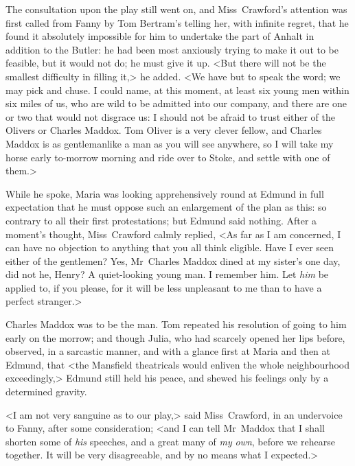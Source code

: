 The consultation upon the play still went on, and Miss~Crawford's attention was first called from Fanny by Tom Bertram's telling her, with infinite regret, that he found it absolutely impossible for him to undertake the part of Anhalt in addition to the Butler: he had been most anxiously trying to make it out to be feasible, but it would not do; he must give it up. <But there will not be the smallest difficulty in filling it,> he added. <We have but to speak the word; we may pick and chuse. I could name, at this moment, at least six young men within six miles of us, who are wild to be admitted into our company, and there are one or two that would not disgrace us: I should not be afraid to trust either of the Olivers or Charles Maddox. Tom Oliver is a very clever fellow, and Charles Maddox is as gentlemanlike a man as you will see anywhere, so I will take my horse early to-morrow morning and ride over to Stoke, and settle with one of them.>

While he spoke, Maria was looking apprehensively round at Edmund in full expectation that he must oppose such an enlargement of the plan as this: so contrary to all their first protestations; but Edmund said nothing. After a moment's thought, Miss~Crawford calmly replied, <As far as I am concerned, I can have no objection to anything that you all think eligible. Have I ever seen either of the gentlemen? Yes, Mr~Charles Maddox dined at my sister's one day, did not he, Henry? A quiet-looking young man. I remember him. Let \textit{him}  be applied to, if you please, for it will be less unpleasant to me than to have a perfect stranger.>

Charles Maddox was to be the man. Tom repeated his resolution of going to him early on the morrow; and though Julia, who had scarcely opened her lips before, observed, in a sarcastic manner, and with a glance first at Maria and then at Edmund, that <the Mansfield theatricals would enliven the whole neighbourhood exceedingly,> Edmund still held his peace, and shewed his feelings only by a determined gravity.

<I am not very sanguine as to our play,> said Miss~Crawford, in an undervoice to Fanny, after some consideration; <and I can tell Mr~Maddox that I shall shorten some of \textit{his}  speeches, and a great many of \textit{my}  \textit{own}, before we rehearse together. It will be very disagreeable, and by no means what I expected.> 